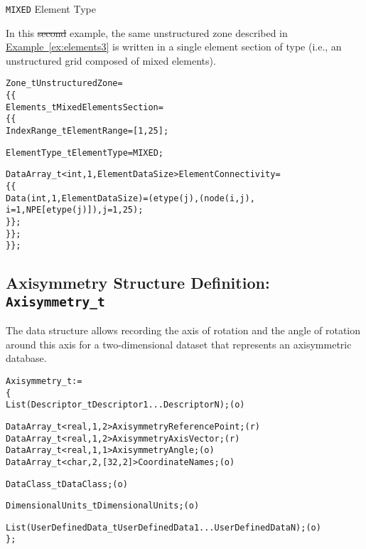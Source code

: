 \begin{example}{\texttt{MIXED} Element Type}
\label{ex:elements4}

In this \sout{second} example, the same unstructured zone described in 
\hyperref[ex:elements3]{Example~\ref*{ex:elements3}} is written in a
single element section of type  (i.e., an unstructured grid
composed of mixed elements).
\begin{alltt}
  Zone\_t UnstructuredZone =
    \{\{
    Elements\_t MixedElementsSection =
      \{\{
      IndexRange\_t ElementRange = [1,25] ;

      ElementType\_t ElementType = MIXED ;

      DataArray\_t<int, 1, ElementDataSize> ElementConnectivity =
        \{\{
        Data(int, 1, ElementDataSize) = (etype(j),(node(i,j),
             i=1,NPE[etype(j)]), j=1,25) ;
        \}\} ;
      \}\} ;
    \}\} ;
\end{alltt}
\end{example}

\subsection{Axisymmetry Structure Definition: \texttt{Axisymmetry\_t}}
\label{s:Axisymmetry}

The  data structure allows recording the axis of
rotation and the angle of rotation around this axis for a two-dimensional
dataset that represents an axisymmetric database.

\begin{alltt}
  Axisymmetry\_t :=
    \{
    List( Descriptor\_t Descriptor1 ... DescriptorN ) ;                      (o)

    DataArray\_t<real,1,2> AxisymmetryReferencePoint ;                       (r)
    DataArray\_t<real,1,2> AxisymmetryAxisVector ;                           (r)
    DataArray\_t<real,1,1> AxisymmetryAngle ;                                (o)
    DataArray\_t<char,2,[32,2]> CoordinateNames ;                            (o)

    DataClass\_t DataClass ;                                                 (o)

    DimensionalUnits\_t DimensionalUnits ;                                   (o)

    List( UserDefinedData\_t UserDefinedData1 ... UserDefinedDataN ) ;       (o)
    \} ;
\end{alltt}

